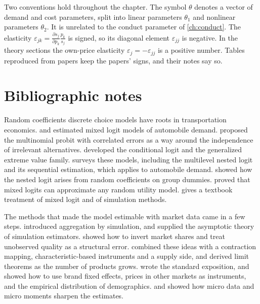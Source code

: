 Two conventions hold throughout the chapter. The symbol $\theta$ denotes a vector of demand and cost parameters,
split into linear parameters $\theta_1$ and nonlinear parameters $\theta_2$. It is unrelated to the conduct
parameter of \cref{ch:conduct}. The elasticity $\varepsilon_{jk} = \frac{\partial s_j}{\partial p_k}\frac{p_k}{s_j}$
is signed, so its diagonal element $\varepsilon_{jj}$ is negative. In the theory sections the own-price elasticity
$\varepsilon_j = -\varepsilon_{jj}$ is a positive number. Tables reproduced from papers keep the papers' signs, and
their notes say so.







\section{Bibliographic notes}\label{sec:08-notes}

Random coefficients discrete choice models have roots in transportation economics. \citet{BoydMellman1980} and
\citet{CardellDunbar1980} estimated mixed logit models of automobile demand. \citet{HausmanWise1978} proposed the
multinomial probit with correlated errors as a way around the independence of irrelevant alternatives.
\citet{McFadden1974,McFadden1978,McFadden1981} developed the conditional logit and the generalized extreme value
family. \citet{McFadden1984} surveys these models, including the multilevel nested logit and its sequential
estimation, which \citet{Goldberg1995} applies to automobile demand. \citet{Cardell1997} showed how the nested logit arises from random coefficients on group dummies.
\citet{McFaddenTrain2000} proved that mixed logits can approximate any random utility model. \citet{Train2009}
gives a textbook treatment of mixed logit and of simulation methods.

The methods that made the model estimable with market data came in a few steps. \citet{Pakes1986} introduced
aggregation by simulation, and \citet{PakesPollard1989} supplied the asymptotic theory of simulation estimators.
\citet{Berry1994} showed how to invert market shares and treat unobserved quality as a structural error.
\citet{BerryLevinsohnPakes1995} combined these ideas with a contraction mapping, characteristic-based instruments
and a supply side, and \citet{BerryLintonPakes2004} derived limit theorems as the number of products grows.
\citet{Nevo2000a} wrote the standard exposition, and \citet{Nevo2001} showed how to use brand fixed effects,
prices in other markets as instruments, and the empirical distribution of demographics.
\citet{BerryLevinsohnPakes2004} and \citet{Petrin2002} showed how micro data and micro moments sharpen the
estimates.

